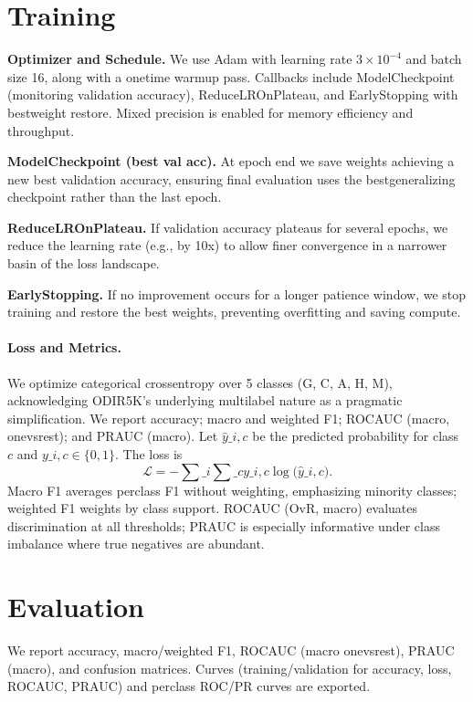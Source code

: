 \section{Training}
\textbf{Optimizer and Schedule.} We use Adam with learning rate $3\times 10^{-4}$ and batch size 16, along with a one\textendash time warm\textendash up pass. Callbacks include ModelCheckpoint (monitoring validation accuracy), ReduceLROnPlateau, and EarlyStopping with best\textendash weight restore. Mixed precision is enabled for memory efficiency and throughput.

\textbf{ModelCheckpoint (best val acc).} At epoch end we save weights achieving a new best validation accuracy, ensuring final evaluation uses the best\textendash generalizing checkpoint rather than the last epoch.

\textbf{ReduceLROnPlateau.} If validation accuracy plateaus for several epochs, we reduce the learning rate (e.g., by 10x) to allow finer convergence in a narrower basin of the loss landscape.

\textbf{EarlyStopping.} If no improvement occurs for a longer patience window, we stop training and restore the best weights, preventing overfitting and saving compute.

\paragraph{Loss and Metrics.} We optimize categorical cross\textendash entropy over 5 classes (G, C, A, H, M), acknowledging ODIR\textendash 5K's underlying multi\textendash label nature as a pragmatic simplification. We report accuracy; macro and weighted F1; ROC\textendash AUC (macro, one\textendash vs\textendash rest); and PR\textendash AUC (macro). Let $\hat{y}\_{i,c}$ be the predicted probability for class $c$ and $y\_{i,c}\in\{0,1\}$. The loss is
\[ \mathcal{L} = -\sum\_{i}\sum\_{c} y\_{i,c}\log\big(\hat{y}\_{i,c}\big). \]
Macro F1 averages per\textendash class F1 without weighting, emphasizing minority classes; weighted F1 weights by class support. ROC\textendash AUC (OvR, macro) evaluates discrimination at all thresholds; PR\textendash AUC is especially informative under class imbalance where true negatives are abundant.

\section{Evaluation}
We report accuracy, macro/weighted F1, ROC\textendash AUC (macro one\textendash vs\textendash rest), PR\textendash AUC (macro), and confusion matrices. Curves (training/validation for accuracy, loss, ROC\textendash AUC, PR\textendash AUC) and per\textendash class ROC/PR curves are exported.

